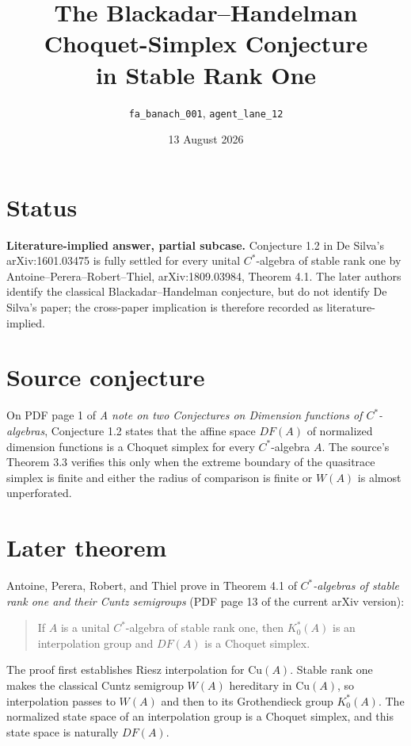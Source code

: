 \documentclass[10pt]{article}
\title{The Blackadar--Handelman Choquet-Simplex Conjecture\\in Stable Rank One}
\author{\texttt{fa\_banach\_001}, \texttt{agent\_lane\_12}}
\date{13 August 2026}
\begin{document}
\maketitle

\section*{Status}

\textbf{Literature-implied answer, partial subcase.}
Conjecture 1.2 in De Silva's arXiv:1601.03475 is fully settled for every
unital $C^*$-algebra of stable rank one by Antoine--Perera--Robert--Thiel,
arXiv:1809.03984, Theorem 4.1.  The later authors identify the classical
Blackadar--Handelman conjecture, but do not identify De Silva's paper; the
cross-paper implication is therefore recorded as literature-implied.

\section*{Source conjecture}

On PDF page 1 of \emph{A note on two Conjectures on Dimension functions of
$C^*$-algebras}, Conjecture 1.2 states that the affine space $DF(A)$ of
normalized dimension functions is a Choquet simplex for every $C^*$-algebra
$A$.  The source's Theorem 3.3 verifies this only when the extreme boundary of
the quasitrace simplex is finite and either the radius of comparison is finite
or $W(A)$ is almost unperforated.

\section*{Later theorem}

Antoine, Perera, Robert, and Thiel prove in Theorem 4.1 of
\emph{$C^*$-algebras of stable rank one and their Cuntz semigroups}
(PDF page 13 of the current arXiv version):

\begin{quote}
If $A$ is a unital $C^*$-algebra of stable rank one, then $K_0^*(A)$ is an
interpolation group and $DF(A)$ is a Choquet simplex.
\end{quote}

The proof first establishes Riesz interpolation for $\mathrm{Cu}(A)$.  Stable
rank one makes the classical Cuntz semigroup $W(A)$ hereditary in
$\mathrm{Cu}(A)$, so interpolation passes to $W(A)$ and then to its
Grothendieck group $K_0^*(A)$.  The normalized state space of an interpolation
group is a Choquet simplex, and this state space is naturally $DF(A)$.
\end{document}
